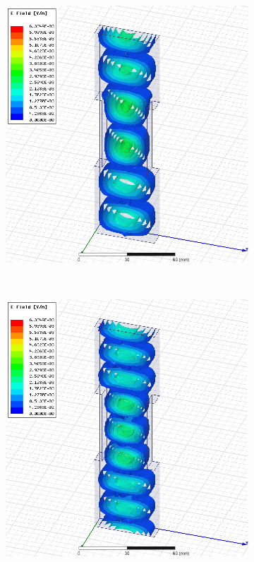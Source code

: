 \documentclass[12pt,a4paper]{article}
\begin{document}
\begin{figure}
\begin{subfigure}[b]{0.49\textwidth}
    \includegraphics[width=\textwidth]{./mid_sec_30mm_wide_50mm_long/7ghz.png}
    \label{fig:2_3050_7ghz}
  \end{subfigure}\\
  \begin{subfigure}[b]{0.49\textwidth}
    \includegraphics[width=\textwidth]{./mid_sec_30mm_wide_50mm_long/9ghz.png}

\end{subfigure}
\end{figure}
\end{document}
